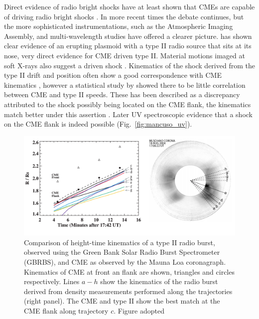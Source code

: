 
Direct evidence of radio bright shocks have at least shown that CMEs are capable of driving radio bright shocks \citep{maia2000}.
In more recent times the debate continues, but the more sophisticated instrumentations, such as the Atmospheric Imaging Assembly, and multi-wavelength studies have offered a clearer picture. \citet{bain2012} has shown clear evidence of an erupting plasmoid with a type II radio source that sits at its nose, very direct evidence for CME driven type II. Material motions imaged at soft X-rays also suggest a driven shock \citep{klein1999}. Kinematics of the shock derived from the type II drift and position often show a good correspondence with CME kinematics \citep{mancuso2011}, however a statistical study by \citet{reiner2001} showed there to be little correlation between CME and type II speeds. These has been described as a discrepancy attributed to the shock possibly being located on the CME flank, the kinematics match better under this assertion \citep{mancuso2004, cho2007, cho2012}. Later UV spectroscopic evidence that a shock on the CME flank is indeed possible (Fig.~\ref{fig:mancuso_uv}). 

\begin{figure}[t!]
\begin{center}
\includegraphics[scale=0.27, trim=0cm 1cm 0cm 1cm]{images/cho_trim.png}
\caption[Comparison of CME and type II height-time kinematics]{Comparison of height-time kinematics of a type II radio burst, observed using the Green Bank Solar Radio Burst Spectrometer (GBRBS), and CME as observed by the Mauna Loa coronagraph. Kinematics of CME at front an flank are shown, triangles and circles respectively.
Lines $a-h$ show the kinematics of the radio burst derived from density measurements performed along the trajectories (right panel). The CME and type II show the best match at the CME flank along trajectory $c$. Figure adopted \citep{cho2007}}
\label{fig:cho}
\end{center}
\end{figure}

